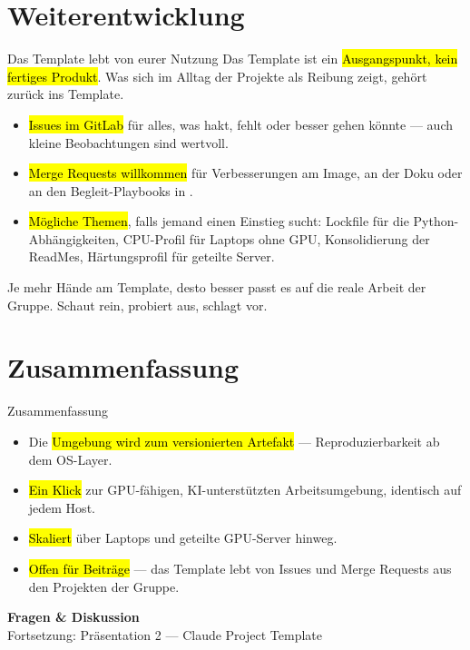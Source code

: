 \documentclass[aspectratio=169,11pt]{beamer}
\begin{document}
\section{Weiterentwicklung}
\begin{frame}{Das Template lebt von eurer Nutzung}
  Das Template ist ein \hl{Ausgangspunkt, kein fertiges Produkt}.
  Was sich im Alltag der Projekte als Reibung zeigt, gehört zurück ins Template.
  \vspace{0.6em}
  \begin{itemize}
    \item \hl{Issues im GitLab} für alles, was hakt, fehlt oder besser gehen
          könnte --- auch kleine Beobachtungen sind wertvoll.
    \item \hl{Merge Requests willkommen} für Verbesserungen am Image,
          an der Doku oder an den Begleit-Playbooks in .
    \item \hl{Mögliche Themen}, falls jemand einen Einstieg sucht:
          Lockfile für die Python-Abhängigkeiten, CPU-Profil für Laptops
          ohne GPU, Konsolidierung der ReadMes, Härtungsprofil für
          geteilte Server.
  \end{itemize}
  \vfill
  \begin{takeaway}
    Je mehr Hände am Template, desto besser passt es auf die reale
    Arbeit der Gruppe. Schaut rein, probiert aus, schlagt vor.
  \end{takeaway}
\end{frame}

\section{Zusammenfassung}
\begin{frame}{Zusammenfassung}
  \begin{itemize}
    \item Die \hl{Umgebung wird zum versionierten Artefakt} ---
          Reproduzierbarkeit ab dem OS-Layer.
    \item \hl{Ein Klick} zur GPU-fähigen, KI-unterstützten Arbeitsumgebung,
          identisch auf jedem Host.
    \item \hl{Skaliert} über Laptops und geteilte GPU-Server hinweg.
    \item \hl{Offen für Beiträge} --- das Template lebt von Issues und
          Merge Requests aus den Projekten der Gruppe.
  \end{itemize}
  \vfill
  \begin{center}
    {\large\color{hhnblue}\textbf{Fragen \& Diskussion}}\\[2pt]
    {\footnotesize\color{darkgray} Fortsetzung: Präsentation 2 --- Claude Project Template}
  \end{center}
\end{frame}
\end{document}
